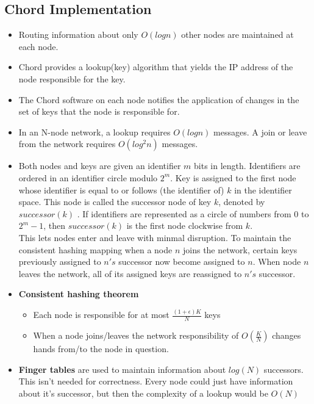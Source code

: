\documentclass[parskip=half]{scrartcl}
\begin{document}
    \subsection{Chord Implementation} %
    \label{sub:chord_implementatio}
    \begin{itemize}
        \item
        Routing information about only $O(log n)$ other nodes are maintained at each node.
        \item
        Chord provides a lookup(key) algorithm that yields the IP address of the node responsible for the key.
        \item
        The Chord software on each node notifies the application of changes in the set of keys that the node is responsible for.
        \item
        In an N-node network, a lookup requires $O(log n)$ messages. A join or leave from the network requires $O(log^2 n)$ messages.
        \item
        Both nodes and keys are given an identifier $m$ bits in length.  Identifiers are ordered in an identifier circle modulo $2^m$. Key is assigned to the first node whose identifier is equal to or follows (the identifier of) $k$ in the identifier space. This node is called the successor node of key $k$, denoted by $successor(k)$ . If identifiers are represented as a circle of numbers from 0 to $2^m - 1$, then $successor(k)$ is the first node clockwise from $k$.\\
        This lets nodes enter and leave with minmal disruption.  To maintain the consistent hashing mapping when a node $n$ joins the network, certain keys previously assigned to $n's$ successor now become assigned to $n$. When node $n$ leaves the network, all of its assigned keys are reassigned to $n's$ successor.
        \item
        \textbf{Consistent hashing theorem}
        \begin{itemize}
            \item
            Each node is responsible for at most $\frac{(1 + \epsilon) K}{N}$ keys
            \item
            When a node joins/leaves the network responsibility of $O(\frac{K}{N})$ changes hands from/to the node in question.
        \end{itemize}
        \item
        \textbf{Finger tables} are used to maintain information about $log(N)$ successors. This isn't needed for correctness. Every node could just have information about it's successor, but then the complexity of a lookup would be $O(N)$\\

\end{itemize}
\end{document}
